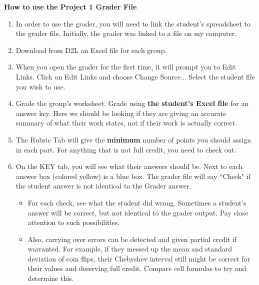 \documentclass{article}
\begin{document}
\begin{center}
\textbf{
{\large How to use the Project 1 Grader File}	
 }
\end{center}
	
\begin{enumerate}
    
    \item In order to use the grader, you will need to link the student's spreadsheet to the grader file. Initially, the grader was linked to a file on my computer.
    
    \item Download from D2L an Excel file for each group. 
    
    \item When you open the grader for the first time, it will prompt you to Edit Links. Click on Edit Links and choose Change Source... Select the student file you wish to use.
    
    \item Grade the group's worksheet. Grade using \textbf{the student's Excel file} for an answer key. Here we should be looking if they are giving an accurate summary of what their work states, not if their work is actually correct.
    
    \item The Rubric Tab will give the \textbf{minimum} number of points you should assign in each part. For anything that is not full credit, you need to check out.
    
    \item On the KEY tab, you will see what their answers should be. Next to each answer box (colored yellow) is a blue box. The grader file will say ``Check" if the student answer is not identical to the Grader answer.
        
        \begin{itemize}
        
            \item For each check, see what the student did wrong. Sometimes a student's answer will be correct, but not identical to the grader output. Pay close attention to such possibilities.
    
            \item Also, carrying over errors can be detected and given partial credit if warranted. For example, if they messed up the mean and standard deviation of coin flips, their Chebyshev interval still might be correct for their values and deserving full credit. Compare cell formulas to try and determine this.
            

\end{itemize}
\end{enumerate}
\end{document}
